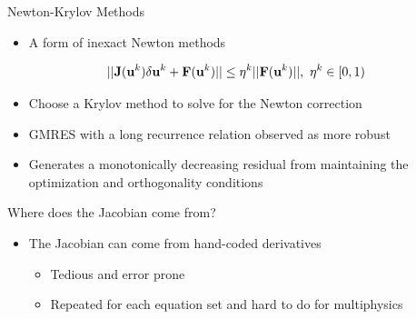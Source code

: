 \documentclass{beamer}
\begin{document}
\begin{frame}{Newton-Krylov Methods}

  \begin{itemize}
  \item A form of inexact Newton methods
  \end{itemize}

  \[
  ||\mathbf{J}(\mathbf{u}^k)\delta \mathbf{u}^k + \mathbf{F}(\mathbf{u}^k)|| \leq \eta^k
  ||\mathbf{F}(\mathbf{u}^k)||,\ \eta^k \in [0,1)
    \]

    \begin{itemize}
    \item Choose a Krylov method to solve for the Newton correction
    \item GMRES with a long recurrence relation observed as more
      robust
    \item Generates a monotonically decreasing residual from
      maintaining the optimization and orthogonality conditions
    \end{itemize}

    \pause Where does the Jacobian come from?  \pause
    \begin{itemize}
    \item The Jacobian can come from hand-coded derivatives
      \begin{itemize}
      \item Tedious and error prone
      \item Repeated for each equation set and hard to do for
        multiphysics
      \end{itemize}
    \end{itemize} 

\end{frame}
\end{document}
